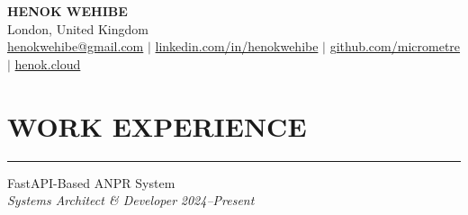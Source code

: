 \documentclass{article}
\begin{document}
\begin{center}
\textbf{\huge HENOK WEHIBE} \\
\vspace{1.0em}
London, United Kingdom \\
\vspace{0.5em}
\href{mailto:henokwehibe@gmail.com}{henokwehibe@gmail.com} $|$
\href{https://linkedin.com/in/henokwehibe}{linkedin.com/in/henokwehibe} $|$
\href{https://github.com/micrometre}{github.com/micrometre} $|$
\href{https://henok.cloud}{henok.cloud}\\
\end{center}
\vspace{-3.6em}
\section* {WORK EXPERIENCE}
\vspace{0.6em}
\hrule 
{\bf}{} FastAPI-Based ANPR System \hfill {} \\
{\em Systems Architect \& Developer} \hfill {\em 2024–Present} %
\end{document}
